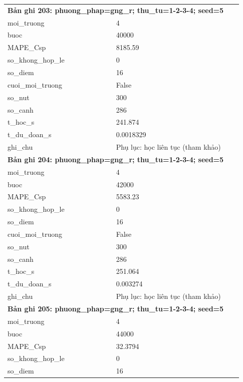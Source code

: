 \begin{longtable}{p{0.43\linewidth}p{0.50\linewidth}}
\midrule
\multicolumn{2}{p{0.95\linewidth}}{\textbf{Bản ghi 203: phuong\_phap=gng\_r; thu\_tu=1-2-3-4; seed=5}} \\
moi\_\allowbreak truong & 4 \\
buoc & 40000 \\
MAPE\_\allowbreak Csp & 8185.59 \\
so\_\allowbreak khong\_\allowbreak hop\_\allowbreak le & 0 \\
so\_\allowbreak diem & 16 \\
cuoi\_\allowbreak moi\_\allowbreak truong & False \\
so\_\allowbreak nut & 300 \\
so\_\allowbreak canh & 286 \\
t\_\allowbreak hoc\_\allowbreak s & 241.874 \\
t\_\allowbreak du\_\allowbreak doan\_\allowbreak s & 0.0018329 \\
ghi\_\allowbreak chu & Phụ lục: học liên tục (tham khảo) \\
\midrule
\multicolumn{2}{p{0.95\linewidth}}{\textbf{Bản ghi 204: phuong\_phap=gng\_r; thu\_tu=1-2-3-4; seed=5}} \\
moi\_\allowbreak truong & 4 \\
buoc & 42000 \\
MAPE\_\allowbreak Csp & 5583.23 \\
so\_\allowbreak khong\_\allowbreak hop\_\allowbreak le & 0 \\
so\_\allowbreak diem & 16 \\
cuoi\_\allowbreak moi\_\allowbreak truong & False \\
so\_\allowbreak nut & 300 \\
so\_\allowbreak canh & 286 \\
t\_\allowbreak hoc\_\allowbreak s & 251.064 \\
t\_\allowbreak du\_\allowbreak doan\_\allowbreak s & 0.003274 \\
ghi\_\allowbreak chu & Phụ lục: học liên tục (tham khảo) \\
\midrule
\multicolumn{2}{p{0.95\linewidth}}{\textbf{Bản ghi 205: phuong\_phap=gng\_r; thu\_tu=1-2-3-4; seed=5}} \\
moi\_\allowbreak truong & 4 \\
buoc & 44000 \\
MAPE\_\allowbreak Csp & 32.3794 \\
so\_\allowbreak khong\_\allowbreak hop\_\allowbreak le & 0 \\
so\_\allowbreak diem & 16 \\

\end{longtable}
